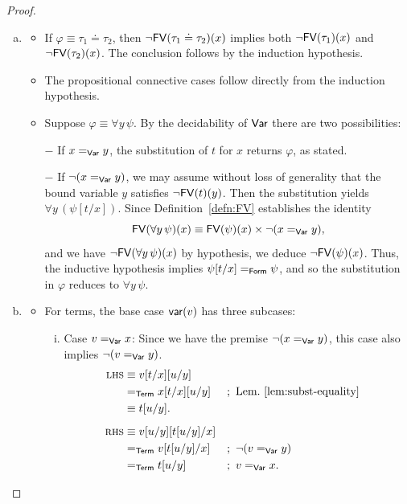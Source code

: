 \begin{proof}
\begin{enumerate}[a),font=\upshape]
        \item 
        \begin{itemize}
            \item If $\varphi\equiv \tau_1\doteq \tau_2$, then $\neg\mathsf{FV}(\tau_1\doteq \tau_2)(x)$ implies both $\neg\mathsf{FV}(\tau_1)(x)$ and $\neg\mathsf{FV}(\tau_2)(x)$. The conclusion follows by the induction hypothesis.
            
            \item The propositional connective cases follow directly from the induction hypothesis.
            
            \item Suppose $\varphi\equiv\forall y\,\psi$. By the decidability of $\mathsf{Var}$ there are two possibilities:
            
            $-$ If $x\mathrel{=_{\mathsf{Var}}}y$, the substitution of $t$ for $x$ returns $\varphi$, as stated.
            
            $-$ If $\neg(x\mathrel{=_{\mathsf{Var}}}y)$, we may assume without loss of generality that the bound variable $y$ satisfies $\neg\mathsf{FV}(t)(y)$. Then the substitution yields $\forall y\,(\psi[t/x])$. Since Definition~\ref{defn:FV} establishes the identity
            \[
                \mathsf{FV}(\forall y\,\psi)(x)
                \equiv
                \mathsf{FV}(\psi)(x)
                \times
                \neg(x\mathrel{=_{\mathsf{Var}}}y),
            \]
            and we have $\neg\mathsf{FV}(\forall y\,\psi)(x)$ by hypothesis, we deduce $\neg\mathsf{FV}(\psi)(x)$. Thus, the inductive hypothesis implies $\psi[t/x]\mathrel{=_{\mathsf{Form}}}\psi$, and so the substitution in $\varphi$ reduces to $\forall y\,\psi$.
        \end{itemize}
        
        \item
        \begin{itemize}
            \item For terms, the base case $\mathsf{var}(v)$ has three subcases:
            \begin{enumerate}[i)]
                \item Case $v\mathrel{=_{\mathsf{Var}}}x$: Since we have the premise $\neg(x\mathrel{=_{\mathsf{Var}}}y)$, this case also implies $\neg(v\mathrel{=_{\mathsf{Var}}}y)$.
                \begin{align*}
                    \lhs&\equiv v[t/x][u/y]\\
                        &\eq{\fun{Term}}x[t/x][u/y]
                            &&;\ \text{Lem.~\ref{lem:subst-equality}}\\
                        &\equiv t[u/y].\\[2mm]
                    \rhs&\equiv v[u/y][t[u/y]/x]\\
                        &\eq{\fun{Term}} v[t[u/y]/x]
                            &&;\ \neg(v\eq{\fun{Var}}y)\\
                        &\eq{\fun{Term}} t[u/y]
                            &&;\ v\eq{\fun{Var}}x.
                \end{align*}
                

\end{enumerate}
\end{itemize}
\end{enumerate}
\end{proof}

